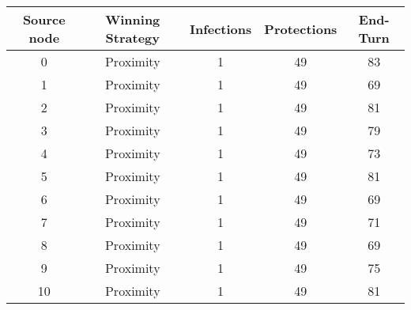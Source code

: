 \documentclass[results.tex]{subfiles}
\begin{document}
    \begin{center}
        \begin{tabular}{| c || c | c | c | c |}
            \hline
            {\bfseries Source node} & {\bfseries Winning Strategy} & {\bfseries Infections} & {\bfseries Protections}
            & {\bfseries End-Turn}
            \\  %
            \hline\hline
            0                       & Proximity                    & 1                      & 49                      & 83                   \\
            \hline
            1                       & Proximity                    & 1                      & 49                      & 69                   \\
            \hline
            2                       & Proximity                    & 1                      & 49                      & 81                   \\
            \hline
            3                       & Proximity                    & 1                      & 49                      & 79                   \\
            \hline
            4                       & Proximity                    & 1                      & 49                      & 73                   \\
            \hline
            5                       & Proximity                    & 1                      & 49                      & 81                   \\
            \hline
            6                       & Proximity                    & 1                      & 49                      & 69                   \\
            \hline
            7                       & Proximity                    & 1                      & 49                      & 71                   \\
            \hline
            8                       & Proximity                    & 1                      & 49                      & 69                   \\
            \hline
            9                       & Proximity                    & 1                      & 49                      & 75                   \\
            \hline
            10                      & Proximity                    & 1                      & 49                      & 81                   \\

\end{tabular}
\end{center}
\end{document}

